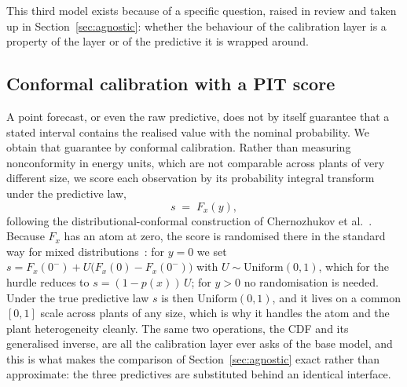 \documentclass[preprint,3p,times]{elsarticle}
\begin{document}
This third model exists because of a specific question, raised in review and taken up in Section~\ref{sec:agnostic}: whether the behaviour of the calibration layer is a property of the layer or of the predictive it is wrapped around.

\subsection{Conformal calibration with a PIT score}
\label{sec:pit}

A point forecast, or even the raw predictive, does not by itself guarantee that a stated interval contains the realised value with the nominal probability. We obtain that guarantee by conformal calibration. Rather than measuring nonconformity in energy units, which are not comparable across plants of very different size, we score each observation by its probability integral transform under the predictive law,
\begin{equation}
s \;=\; F_x(y),
\label{eq:pit}
\end{equation}
following the distributional-conformal construction of Chernozhukov et al.~\cite{chernozhukov2021}. Because $F_x$ has an atom at zero, the score is randomised there in the standard way for mixed distributions~\cite{smith1985}: for $y=0$ we set $s=F_x(0^-)+U\big(F_x(0)-F_x(0^-)\big)$ with $U\sim\mathrm{Uniform}(0,1)$, which for the hurdle reduces to $s=(1-p(x))\,U$; for $y>0$ no randomisation is needed. Under the true predictive law $s$ is then $\mathrm{Uniform}(0,1)$, and it lives on a common $[0,1]$ scale across plants of any size, which is why it handles the atom and the plant heterogeneity cleanly. The same two operations, the CDF and its generalised inverse, are all the calibration layer ever asks of the base model, and this is what makes the comparison of Section~\ref{sec:agnostic} exact rather than approximate: the three predictives are substituted behind an identical interface.
\end{document}
